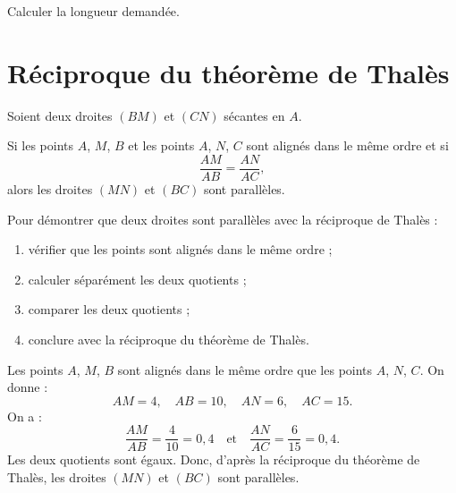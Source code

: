 \documentclass[a4paper,10pt]{report}
\begin{document}
\begin{ex}
Calculer la longueur demandée.

\begin{center}
\end{center}

\noindent\grandscarreaux{\linewidth}{4cm}
\end{ex}

\section{Réciproque du théorème de Thalès}

\begin{thm}
Soient deux droites $(BM)$ et $(CN)$ sécantes en $A$.

Si les points $A$, $M$, $B$ et les points $A$, $N$, $C$ sont alignés dans le même ordre et si
\[
\dfrac{AM}{AB}=\dfrac{AN}{AC},
\]
alors les droites $(MN)$ et $(BC)$ sont parallèles.
\end{thm}

\begin{meth}
Pour démontrer que deux droites sont parallèles avec la réciproque de Thalès :
\begin{enumerate}
\item vérifier que les points sont alignés dans le même ordre ;
\item calculer séparément les deux quotients ;
\item comparer les deux quotients ;
\item conclure avec la réciproque du théorème de Thalès.
\end{enumerate}
\end{meth}

\begin{ex}
Les points $A$, $M$, $B$ sont alignés dans le même ordre que les points $A$, $N$, $C$.
On donne :
\[
AM=4,\quad AB=10,\quad AN=6,\quad AC=15.
\]
On a :
\[
\dfrac{AM}{AB}=\dfrac{4}{10}=0,4
\quad \text{et} \quad
\dfrac{AN}{AC}=\dfrac{6}{15}=0,4.
\]
Les deux quotients sont égaux.
Donc, d'après la réciproque du théorème de Thalès, les droites $(MN)$ et $(BC)$ sont parallèles.
\end{ex}
\end{document}
